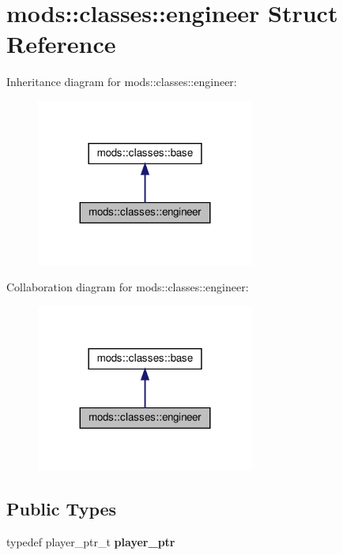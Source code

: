 \hypertarget{structmods_1_1classes_1_1engineer}{}\section{mods\+:\+:classes\+:\+:engineer Struct Reference}
\label{structmods_1_1classes_1_1engineer}


Inheritance diagram for mods\+:\+:classes\+:\+:engineer\+:\nopagebreak
\begin{figure}[H]
\begin{center}
\leavevmode
\includegraphics[width=203pt]{structmods_1_1classes_1_1engineer__inherit__graph}
\end{center}
\end{figure}


Collaboration diagram for mods\+:\+:classes\+:\+:engineer\+:\nopagebreak
\begin{figure}[H]
\begin{center}
\leavevmode
\includegraphics[width=203pt]{structmods_1_1classes_1_1engineer__coll__graph}
\end{center}
\end{figure}
\subsection*{Public Types}
\begin{DoxyCompactItemize}
\item 
\mbox{\label{structmods_1_1classes_1_1engineer_a4fd6b6629da4f29eb10527d8e653730d}} 
typedef player\+\_\+ptr\+\_\+t {\bfseries player\+\_\+ptr}
\end{DoxyCompactItemize}
